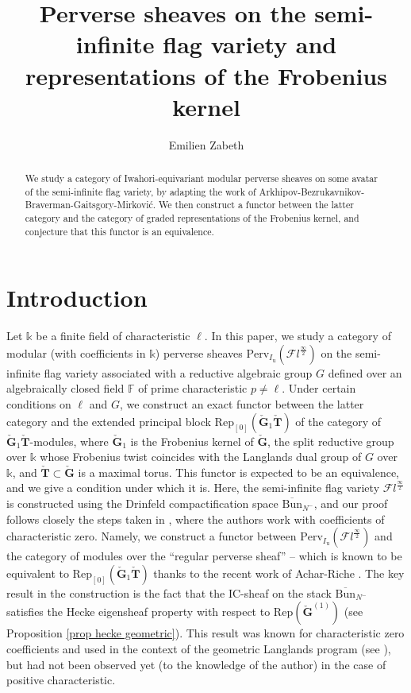 \documentclass[11pt]{amsart}
\author{Emilien Zabeth}
\theoremstyle{plain}
\theoremstyle{remark}
\numberwithin{equation}{section}
\begin{document}
	\title[Perverse sheaves on the semi-infinite flag variety]{Perverse sheaves on the semi-infinite flag variety and representations of the Frobenius kernel}

	\maketitle
     \begin{abstract}
 We study a category of Iwahori-equivariant modular perverse sheaves on some avatar of the semi-infinite flag variety, by adapting the work of Arkhipov-Bezrukavnikov-Braverman-Gaitsgory-Mirkovi\'c. We then construct a functor between the latter category and the category of graded representations of the Frobenius kernel, and conjecture that this functor is an equivalence. 
 \end{abstract}
 \setcounter{tocdepth}{1}
	\tableofcontents
  \section{Introduction}
Let $\mathbb{k}$ be a finite field of characteristic $\ell$. In this paper, we study a category of modular (with coefficients in $\mathbb{k}$) perverse sheaves $\mathrm{Perv}_{I_\mathrm{u}}(\mathcal{F}l^{\frac{\infty}{2}})$ on the semi-infinite flag variety associated with a reductive algebraic group $G$ defined over an algebraically closed field $\mathbb{F}$ of prime characteristic $p\neq\ell$. Under certain conditions on $\ell$ and $G$, we construct an exact functor between the latter category and the extended principal block $\mathrm{Rep}_{[0]}(\check{\mathbf{G}}_1\check{\mathbf{T}})$ of the category of $\check{\mathbf{G}}_1\check{\mathbf{T}}$-modules, where $\check{\mathbf{G}}_1$ is the Frobenius kernel of $\check{\mathbf{G}}$, the split reductive group over $\mathbb{k}$ whose Frobenius twist coincides with the Langlands dual group of $G$ over $\mathbb{k}$, and $\check{\mathbf{T}}\subset \check{\mathbf{G}}$ is a maximal torus. This functor is expected to be an equivalence, and we give a condition under which it is. Here, the semi-infinite flag variety $\mathcal{F}l^{\frac{\infty}{2}}$ is constructed using the Drinfeld compactification space $\overline{\mathrm{Bun}}_{N^-}$, and our proof follows closely the steps taken in \cite{ABBGM}, where the authors work with coefficients of characteristic zero. Namely, we construct a functor between  $\mathrm{Perv}_{I_\mathrm{u}}(\mathcal{F}l^{\frac{\infty}{2}})$ and the category of modules over the ``regular perverse sheaf'' -- which is known to be equivalent to $\mathrm{Rep}_{[0]}(\check{\mathbf{G}}_1\check{\mathbf{T}})$ thanks to the recent work of Achar-Riche \cite{achar2022geometric}. The key result in the construction is the fact that the IC-sheaf on the stack $\overline{\mathrm{Bun}}_{N^-}$ satisfies the Hecke eigensheaf property with respect to $\mathrm{Rep}(\check{\mathbf{G}}^{(1)})$ (see Proposition \ref{prop hecke geometric}). This result was known for characteristic zero coefficients and used in the context of the geometric Langlands program (see \cite{BBGM}), but had not been observed yet (to the knowledge of the author) in the case of positive characteristic. 
\end{document}
